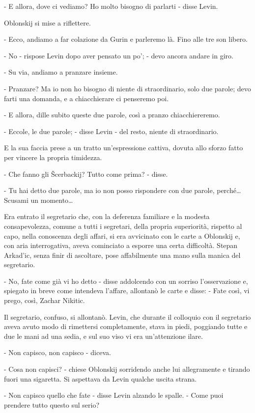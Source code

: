 - E allora, dove ci vediamo? Ho molto bisogno di parlarti - disse Levin. 

Oblonskij si mise a riflettere. 

- Ecco, andiamo a far colazione da Gurin e parleremo là. Fino alle tre son libero. 

- No - rispose Levin dopo aver pensato un po'; - devo ancora andare in giro. 

- Su via, andiamo a pranzare insieme. 

- Pranzare? Ma io non ho bisogno di niente di straordinario, solo due parole; devo farti una domanda, e a chiacchierare ci penseremo poi. 

- E allora, dille subito queste due parole, così a pranzo chiacchiereremo. 

- Eccole, le due parole; - disse Levin - del resto, niente di straordinario. 

E la sua faccia prese a un tratto un'espressione cattiva, dovuta allo sforzo fatto per vincere la propria timidezza. 

- Che fanno gli Šcerbackij? Tutto come prima? - disse. 

- Tu hai detto due parole, ma io non posso rispondere con due parole, perché\ldots{} Scusami un momento\ldots{} 

Era entrato il segretario che, con la deferenza familiare e la modesta consapevolezza, comune a tutti i segretari, della propria superiorità, rispetto al capo, nella conoscenza degli affari, si era avvicinato con le carte a Oblonskij e, con aria interrogativa, aveva cominciato a esporre una certa difficoltà. Stepan Arkad'ic, senza finir di ascoltare, pose affabilmente una mano sulla manica del segretario. 

- No, fate come già vi ho detto - disse addolcendo con un sorriso l'osservazione e, spiegato in breve come intendeva l'affare, allontanò le carte e disse: - Fate così, vi prego, così, Zachar Nikitic. 

Il segretario, confuso, si allontanò. Levin, che durante il colloquio con il segretario aveva avuto modo di rimettersi completamente, stava in piedi, poggiando tutte e due le mani ad una sedia, e sul suo viso vi era un'attenzione ilare. 

- Non capisco, non capisco - diceva. 

- Cosa non capisci? - chiese Oblonskij sorridendo anche lui allegramente e tirando fuori una sigaretta. Si aspettava da Levin qualche uscita strana. 

- Non capisco quello che fate - disse Levin alzando le spalle. - Come puoi prendere tutto questo sul serio? 

